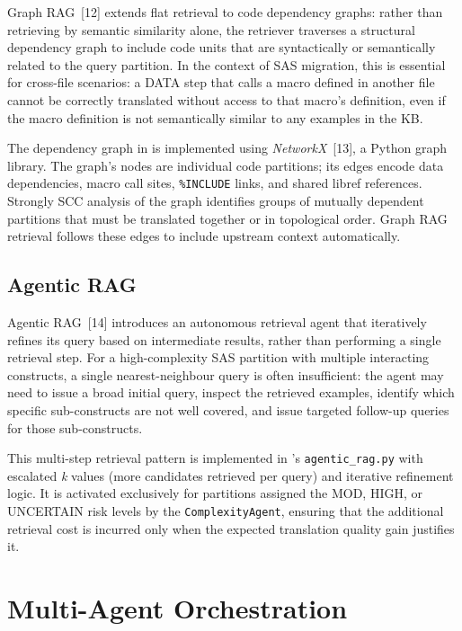 Graph \ac{RAG}~[12] extends flat retrieval to code dependency graphs: rather
than retrieving by semantic similarity alone, the retriever traverses a
structural dependency graph to include code units that are syntactically or
semantically related to the query partition. In the context of SAS migration,
this is essential for cross-file scenarios: a DATA step that calls a macro
defined in another file cannot be correctly translated without access to that
macro's definition, even if the macro definition is not semantically similar to
any examples in the \ac{KB}.

The dependency graph in \codara{} is implemented using \textit{NetworkX}~[13],
a Python graph library. The graph's nodes are individual code partitions; its
edges encode data dependencies, macro call sites, \texttt{\%INCLUDE} links, and
shared libref references. Strongly \ac{SCC} analysis of the graph identifies
groups of mutually dependent partitions that must be translated together or in
topological order. Graph \ac{RAG} retrieval follows these edges to include
upstream context automatically.

\subsection{Agentic RAG}
\label{subsec:agentic-rag-theory}

Agentic \ac{RAG}~[14] introduces an autonomous retrieval agent that iteratively
refines its query based on intermediate results, rather than performing a single
retrieval step. For a high-complexity SAS partition with multiple interacting
constructs, a single nearest-neighbour query is often insufficient: the agent
may need to issue a broad initial query, inspect the retrieved examples,
identify which specific sub-constructs are not well covered, and issue targeted
follow-up queries for those sub-constructs.

This multi-step retrieval pattern is implemented in \codara{}'s
\texttt{agentic\_rag.py} with escalated \emph{k} values (more candidates
retrieved per query) and iterative refinement logic. It is activated
exclusively for partitions assigned the MOD, HIGH, or UNCERTAIN risk levels
by the \texttt{ComplexityAgent}, ensuring that the additional retrieval cost
is incurred only when the expected translation quality gain justifies it.

\section{Multi-Agent Orchestration}
\label{sec:mas-theory}

